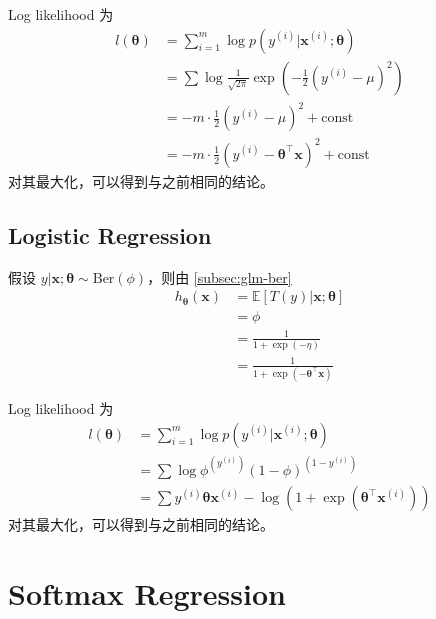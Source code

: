 			Log likelihood 为
			\begin{align*}
				l(\bm{\theta}) &= \sum_{i=1}^{m} \log p(y^{(i)} | \bm{x}^{(i)}; \bm{\theta}) \\
				&= \sum \log \frac{1}{\sqrt{2\pi}} \exp \left( - \frac{1}{2} (y^{(i)}-\mu)^2 \right) \\
				&= -m \cdot \frac{1}{2} (y^{(i)} - \mu)^2 + \text{const} \\
				&= -m \cdot \frac{1}{2} (y^{(i)} - \bm{\theta}^\intercal \bm{x})^2 + \text{const}
			\end{align*}
			对其最大化，可以得到与之前相同的结论。
			
		\subsection{Logistic Regression}
			假设 $ y | \bm{x} ; \bm{\theta} \sim \text{Ber}(\phi) $，则由 \ref{subsec:glm-ber} 
			\begin{align*}
				h_{\bm{\theta}} (\bm{x}) &= \mathbb{E} [T(y) | \bm{x}; \bm{\theta}] \\
				&= \phi \\
				&= \frac{1}{1 + \exp(-\eta)} \\
				&= \frac{1}{1 + \exp(-\bm{\theta}^\intercal \bm{x})}
			\end{align*}
			
			Log likelihood 为
			\begin{align*}
				l(\bm{\theta}) &= \sum_{i=1}^{m} \log p(y^{(i)} | \bm{x}^{(i)}; \bm{\theta}) \\
				&= \sum \log \phi^{(y^{(i)})} (1-\phi)^{(1-y^{(i)})} \\
				&= \sum y^{(i)} \bm{\theta} \bm{x}^{(i)} - \log \left( 1+\exp(\bm{\theta}^\intercal \bm{x}^{(i)}) \right)
			\end{align*}
			对其最大化，可以得到与之前相同的结论。
			
	\section{Softmax Regression}

